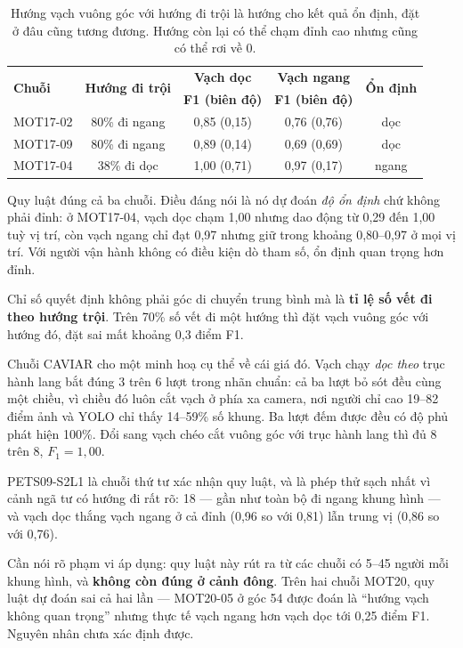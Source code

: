 \begin{table}[H]
\centering
\caption{Hướng vạch vuông góc với hướng đi trội là hướng cho kết quả ổn định, đặt ở đâu
cũng tương đương. Hướng còn lại có thể chạm đỉnh cao nhưng cũng có thể rơi về 0.}
\label{tab:mot17-huong}
\small
\begin{tabularx}{\textwidth}{@{}Xcccc@{}}
\toprule
\multirow{2}{*}{\textbf{Chuỗi}} & \multirow{2}{*}{\textbf{Hướng đi trội}} &
\multicolumn{1}{c}{\textbf{Vạch dọc}} & \multicolumn{1}{c}{\textbf{Vạch ngang}} &
\multirow{2}{*}{\textbf{Ổn định}} \\
 & & \textbf{F1 (biên độ)} & \textbf{F1 (biên độ)} & \\
\midrule
MOT17-02 & 80\% đi ngang & 0{,}85 (0{,}15) & 0{,}76 (0{,}76) & dọc \\
MOT17-09 & 80\% đi ngang & 0{,}89 (0{,}14) & 0{,}69 (0{,}69) & dọc \\
MOT17-04 & 38\% đi dọc   & 1{,}00 (0{,}71) & 0{,}97 (0{,}17) & ngang \\
\bottomrule
\end{tabularx}
\end{table}

Quy luật đúng cả ba chuỗi. Điều đáng nói là nó dự đoán \emph{độ ổn định} chứ không phải
đỉnh: ở MOT17-04, vạch dọc chạm 1{,}00 nhưng dao động từ 0{,}29 đến 1{,}00 tuỳ vị trí,
còn vạch ngang chỉ đạt 0{,}97 nhưng giữ trong khoảng 0{,}80--0{,}97 ở mọi vị trí. Với
người vận hành không có điều kiện dò tham số, ổn định quan trọng hơn đỉnh.

Chỉ số quyết định không phải góc di chuyển trung bình mà là \textbf{tỉ lệ số vết đi
theo hướng trội}. Trên 70\% số vết đi một hướng thì đặt vạch vuông góc với hướng đó,
đặt sai mất khoảng 0{,}3 điểm F1.

Chuỗi CAVIAR cho một minh hoạ cụ thể về cái giá đó. Vạch chạy \emph{dọc theo} trục hành
lang bắt đúng 3 trên 6 lượt trong nhãn chuẩn: cả ba lượt bỏ sót đều cùng một chiều, vì
chiều đó luôn cắt vạch ở phía xa camera, nơi người chỉ cao 19--82 điểm ảnh và YOLO chỉ
thấy 14--59\% số khung. Ba lượt đếm được đều có độ phủ phát hiện 100\%. Đổi sang vạch
chéo cắt vuông góc với trục hành lang thì đủ 8 trên 8, $F_1 = 1{,}00$.

PETS09-S2L1 là chuỗi thứ tư xác nhận quy luật, và là phép thử sạch nhất vì cảnh ngã tư
có hướng đi rất rõ: 18\textdegree{} --- gần như toàn bộ đi ngang khung hình --- và vạch
dọc thắng vạch ngang ở cả đỉnh (0{,}96 so với 0{,}81) lẫn trung vị (0{,}86 so với 0{,}76).

Cần nói rõ phạm vi áp dụng: quy luật này rút ra từ các chuỗi có 5--45 người mỗi
khung hình, và \textbf{không còn đúng ở cảnh đông}. Trên hai chuỗi MOT20, quy luật dự
đoán sai cả hai lần --- MOT20-05 ở góc 54\textdegree{} được đoán là ``hướng vạch không
quan trọng'' nhưng thực tế vạch ngang hơn vạch dọc tới 0{,}25 điểm F1. Nguyên nhân chưa
xác định được.

